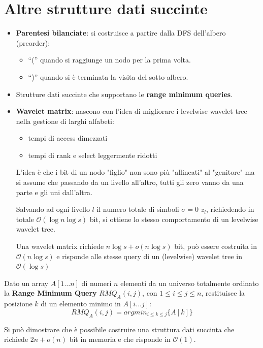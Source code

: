 \section{Altre strutture dati succinte}
\begin{itemize}
    \item \textbf{Parentesi bilanciate}: si costruisce a partire dalla DFS
          dell'albero (preorder):
          \begin{itemize}
              \item ``('' quando si raggiunge un nodo per la prima volta.
              \item ``)'' quando si è terminata la visita del sotto-albero.
          \end{itemize}
    \item Strutture dati succinte che supportano le \textbf{range minimum queries}.
    \item \textbf{Wavelet matrix}: nascono con l'idea di migliorare i levelwise
          wavelet tree nella gestione di larghi alfabeti:
          \begin{itemize}
              \item tempi di access dimezzati
              \item tempi di rank e select leggermente ridotti
          \end{itemize}

          L'idea è che i bit di un nodo "figlio" non sono più "allineati" al
          "genitore" ma si assume che passando da un livello all'altro, tutti gli
          zero vanno da una parte e gli uni dall'altra.

          Salvando ad ogni livello $l$ il numero totale di simboli $\sigma = 0$
          $z_l$, richiedendo in totale $\mathcal{O}(\log n \log s)$ bit, si ottiene
          lo stesso comportamento di un levelwise wavelet tree.

          Una wavelet matrix richiede $n \log s + o(n \log s)$ bit, può essere
          costruita in $\mathcal{O}(n \log s)$ e risponde alle stesse query di un
          (levelwise) wavelet tree in $\mathcal{O}(\log s)$
\end{itemize}
\begin{definizione}
    Dato un array $A[1\dots n]$ di numeri $n$ elementi da un universo totalmente
    ordinato la \textbf{Range Minimum Query} $RMQ_A(i, j)$, con $1 \leq i \leq
        j \leq n$, restituisce la posizione $k$ di un elemento minimo in $A[i
                \dots j]$:$$RMQ_A(i, j) = argmin_{i \leq k \leq j}\{A[k]\}$$

    Si può dimostrare che è possibile costruire una struttura dati succinta che
    richiede $2n + o(n)$ bit in memoria e che risponde in $\mathcal{O}(1)$.
\end{definizione}
